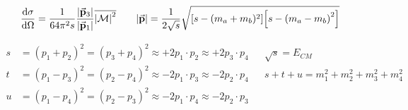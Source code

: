 \begin{equation*}
        \dv{\sigma}{\Omega} = \frac{1}{64\pi^2s}\frac{\abs{\va{p}_{3}}}{\abs{\va{p}_{1}}}\overline{\abs{\operatorname{\mathcal{M}}}^2}
        \qquad
        \abs{\va{p}} = \frac{1}{2\sqrt{s}}\sqrt{\qty[s - (m_a+m_b)^2]\qty[s - \qty(m_a-m_b)^2]}
\end{equation*}

\begin{align*}
        s
        &= (p_1 + p_2)^2 = (p_3 + p_4)^2
        \approx +2p_1\cdot p_2 \approx +2p_3\cdot p_4
        &&
        \sqrt{s} = E_{CM}
        \\
        t
        &= (p_1 - p_3)^2 = (p_2 - p_4)^2
        \approx -2p_1\cdot p_3 \approx -2p_2\cdot p_4
        &&
        s + t + u = m_1^2 + m_2^2 + m_3^2 + m_4^2
        \\
        u
        &= (p_1 - p_4)^2 = (p_2 - p_3)^2
        \approx -2p_1\cdot p_4 \approx -2p_2\cdot p_3
\end{align*}
